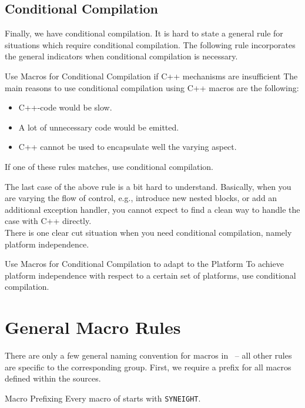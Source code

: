 \subsection{Conditional Compilation}
\label{sec:cond-comp}

Finally, we have conditional compilation. It is hard to state a
general rule for situations which require conditional compilation. The
following rule incorporates the general indicators when conditional
compilation is necessary.
%
\begin{rule*}{Use Macros for Conditional Compilation if C++ mechanisms are
    insufficient}
  The main reasons to use conditional compilation using C++ macros are the
  following:
  \begin{itemize}
  \item C++-code would be slow.
  \item A lot of unnecessary code would be emitted.
  \item C++ cannot be used to encapsulate well the varying aspect.
  \end{itemize}
  If one of these rules matches, use conditional compilation.
\end{rule*}
%
The last case of the above rule is a bit hard to understand.
Basically, when you are varying the flow of control, e.g., introduce
new nested blocks, or add an additional exception handler, you cannot
expect to find a clean way to handle the case with C++ directly.\\
%
There is one clear cut situation when you need conditional
compilation, namely platform independence.
%
\begin{rule*}{Use Macros for Conditional Compilation to adapt to the Platform}
  To achieve platform independence with respect to a certain set of
  platforms, use conditional compilation. 
\end{rule*}

\section{General Macro Rules}
\label{sec:general-macro-rules}

There are only a few general naming convention for macros in \SYNEIGHT\ 
-- all other rules are specific to the corresponding group.
%
First, we require a prefix for all macros defined within the \SYNEIGHT
sources.
%
\begin{rule*}{Macro Prefixing}
    Every macro of \SYNEIGHT starts with {\tt SYNEIGHT}.
\end{rule*}

